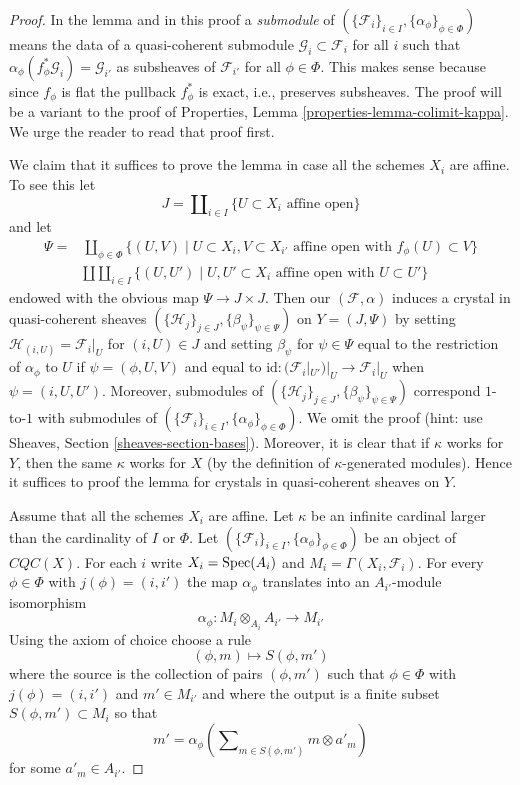 \begin{proof}
In the lemma and in this proof a {\it submodule} of
$(\{\mathcal{F}_i\}_{i \in I}, \{\alpha_\phi\}_{\phi \in \Phi})$
means the data of a quasi-coherent submodule
$\mathcal{G}_i \subset \mathcal{F}_i$ for all $i$ such that
$\alpha_\phi(f_\phi^*\mathcal{G}_i) = \mathcal{G}_{i'}$
as subsheaves of $\mathcal{F}_{i'}$ for all $\phi \in \Phi$.
This makes sense because since $f_\phi$ is flat the
pullback $f^*_\phi$ is exact, i.e., preserves subsheaves.
The proof will be a variant to the proof of
Properties, Lemma \ref{properties-lemma-colimit-kappa}.
We urge the reader to read that proof first.

\medskip\noindent
We claim that it suffices to prove the lemma in case all the schemes
$X_i$ are affine. To see this let
$$
J = \coprod\nolimits_{i \in I} \{U \subset X_i\text{ affine open}\}
$$
and let
\begin{align*}
\Psi = & \coprod\nolimits_{\phi \in \Phi}
\{
(U, V) \mid
U \subset X_i, V \subset X_{i'}\text{ affine open with } f_\phi(U) \subset V
\} \\
&
\amalg \coprod\nolimits_{i \in I}
\{
(U, U') \mid
U, U' \subset X_i\text{ affine open with } U \subset U'
\}
\end{align*}
endowed with the obvious map $\Psi \to J \times J$. Then our
$(\mathcal{F}, \alpha)$ induces a crystal in quasi-coherent sheaves
$(\{\mathcal{H}_j\}_{j \in J}, \{\beta_\psi\}_{\psi \in \Psi})$
on $Y = (J, \Psi)$ by setting $\mathcal{H}_{(i, U)} = \mathcal{F}_i|_U$
for $(i, U) \in J$ and setting $\beta_\psi$ for $\psi \in \Psi$
equal to the restriction of $\alpha_\phi$ to $U$
if $\psi = (\phi, U, V)$ and
equal to $\text{id} : (\mathcal{F}_i|_{U'})|_U \to \mathcal{F}_i|_U$
when $\psi = (i, U, U')$. Moreover, submodules of
$(\{\mathcal{H}_j\}_{j \in J}, \{\beta_\psi\}_{\psi \in \Psi})$
correspond $1$-to-$1$ with submodules of
$(\{\mathcal{F}_i\}_{i \in I}, \{\alpha_\phi\}_{\phi \in \Phi})$.
We omit the proof (hint: use
Sheaves, Section \ref{sheaves-section-bases}).
Moreover, it is clear that if $\kappa$ works for $Y$, then
the same $\kappa$ works for $X$ (by the definition of $\kappa$-generated
modules). Hence it suffices to proof the lemma for crystals in
quasi-coherent sheaves on $Y$.

\medskip\noindent
Assume that all the schemes $X_i$ are affine. Let $\kappa$ be an infinite
cardinal larger than the cardinality of $I$ or $\Phi$. Let
$(\{\mathcal{F}_i\}_{i \in I}, \{\alpha_\phi\}_{\phi \in \Phi})$
be an object of $\textit{CQC}(X)$. For each $i$ write
$X_i = \operatorname{Spec}(A_i)$ and $M_i = \Gamma(X_i, \mathcal{F}_i)$.
For every $\phi \in \Phi$ with $j(\phi) = (i, i')$ the map
$\alpha_\phi$ translates into an $A_{i'}$-module isomorphism
$$
\alpha_\phi : M_i \otimes_{A_i} A_{i'} \longrightarrow M_{i'}
$$
Using the axiom of choice choose a rule
$$
(\phi, m) \longmapsto S(\phi, m')
$$
where the source is the collection of pairs $(\phi, m')$ such that
$\phi \in \Phi$ with $j(\phi) = (i, i')$ and $m' \in M_{i'}$ and
where the output is a finite subset $S(\phi, m') \subset M_i$ so that
$$
m' = \alpha_\phi\left(\sum\nolimits_{m \in S(\phi, m')} m \otimes a'_m\right)
$$
for some $a'_m \in A_{i'}$.


\end{proof}

